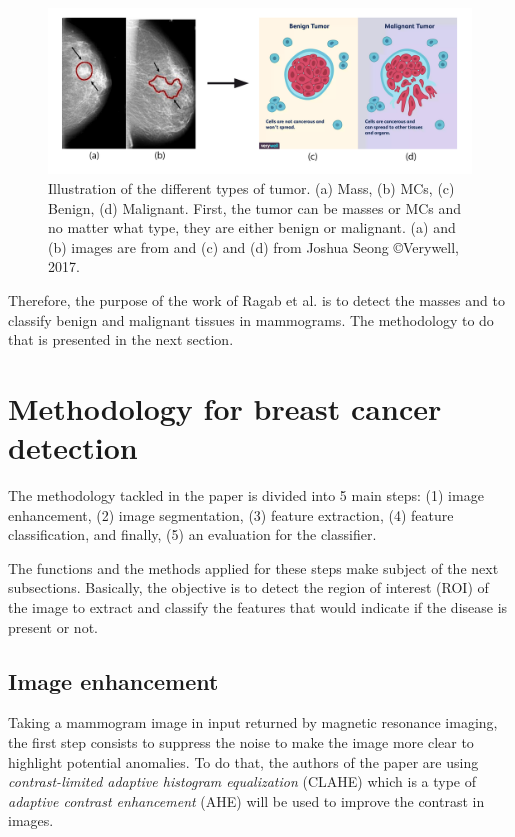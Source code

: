 \documentclass[11pt, openany]{report}
\theoremstyle{plain}
\theoremstyle{definition}
\theoremstyle{remark}
\begin{document}
\begin{figure}[h]
  \centering
  \includegraphics[scale=0.28]{figures/tumor-types.png}
  \caption{Illustration of the different types of tumor. (a) Mass, (b) MCs, (c) Benign, (d) Malignant. First, the tumor can be masses or MCs and no matter what type, they are either benign or malignant. (a) and (b) images are from \cite{breast-cancer} and (c) and (d) from Joshua Seong \copyright Verywell, 2017.}
  \label{fig:tumor-types}
\end{figure}

Therefore, the purpose of the work of Ragab et al. \cite{breast-cancer} is to detect the masses and to classify benign and malignant tissues in mammograms. The methodology to do that is presented in the next section.  

\section{Methodology for breast cancer detection}
The methodology tackled in the paper \cite{breast-cancer} is divided into 5 main steps: (1) image enhancement, (2) image segmentation, (3) feature extraction, (4) feature classification, and finally, (5) an evaluation for the classifier. 

The functions and the methods applied for these steps make subject of the next subsections. Basically, the objective is to detect the region of interest (ROI) of the image to extract and classify the features that would indicate if the disease is present or not. 

\subsection{Image enhancement}
Taking a mammogram image in input returned by magnetic resonance imaging, the first step consists to suppress the noise to make the image more clear to highlight potential anomalies. To do that, the authors of the paper are using \textit{contrast-limited adaptive histogram equalization} (CLAHE) which is a type of \textit{adaptive contrast enhancement} (AHE) will be used to improve the contrast in images.  
\end{document}
